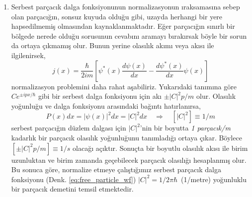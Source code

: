 \documentclass[a4paper,12pt, twoside]{article}
\begin{document}
\begin{enumerate}
	\item Serbest parçacık dalga fonksiyonunun normalizasyonun ıraksamasına sebep olan parçacığın, sonsuz kuyuda olduğu gibi, uzayda herhangi bir yere hapsedilmemiş olmasından kaynaklanmaktadır. Eğer parçacığın sınırlı bir bölgede nerede olduğu sorusunun cevabını aramayı bırakırsak böyle bir sorun da ortaya çıkmamış olur. Bunun yerine olasılık akımı veya akısı ile ilgilenirsek,
	\begin{equation}
	j ( x ) = \frac { \hbar } { 2 i m } \left[ \psi^\ast ( x ) \frac { d \psi ( x ) } { d x } - \frac { d \psi ^ { \ast } ( x ) } { d x } \psi ( x ) \right]
	\end{equation}
	normalizasyon problemini daha rahat aşabiliriz. Yukarıdaki tanımına göre $C e ^ {\pm i p x / \hbar }$ gibi bir serbest dalga fonksiyonu için akı $\pm | C | ^ { 2 } p / m$ olur. Olasılık yoğunluğu ve dalga fonksiyonu arasındaki bağıntı hatırlanırsa,
	\begin{equation}
	P(x) dx = |\psi(x)|^2 dx = |C|^2 dx \quad \Rightarrow \quad [|C|^2]\equiv 1/m
	\end{equation}
	serbest parçacığın düzlem dalgası için $|C|^2$'nin bir boyutta \emph{1 parçacık/m} kadarlık bir parçacık olasılık yoğunluğunu tanımladığı ortaya çıkar. Böylece $[\pm | C | ^ { 2 } p / m] \equiv 1/s$ olacağı açıktır. Sonuçta bir boyutlu olasılık akısı ile birim uzunluktan ve birim zamanda geçebilecek parçacık olasılığı hesaplanmış olur. Bu sonuca göre, normalize etmeye çalıştığımız serbest parçacık dalga fonksiyonu (Denk. 	\ref{eq:free_particle_wf}) $|C|^2 = 1 / 2 \pi \hbar$~(1/metre) yoğunluklu bir parçacık demetini temsil etmektedir.
	

\end{enumerate}
\end{document}
